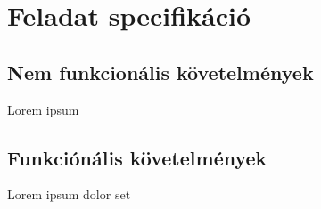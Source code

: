 \chapter{Feladat specifikáció}
\section{Nem funkcionális követelmények}

Lorem ipsum

\section{Funkciónális követelmények}

Lorem ipsum dolor set
